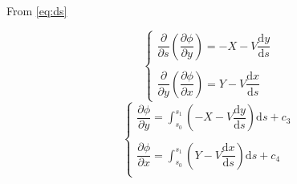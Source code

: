 From \cref{eq:ds}

\begin{equation*}
\left\{\begin{matrix}
    \dfrac{\partial}{\partial s}\left( \dfrac{\partial \phi}{\partial y} \right) = -X - V \dfrac{\mathrm{d}y}{\mathrm{d}s}\\
    \\
    \dfrac{\partial}{\partial y}\left( \dfrac{\partial \phi}{\partial x} \right) = Y - V \dfrac{\mathrm{d}x}{\mathrm{d}s}  
\end{matrix}\right.
\end{equation*}
\begin{equation*}
\left\{\begin{matrix}
    \dfrac{\partial \phi}{\partial y} = \displaystyle\int_{s_0}^{s_1}{\left (-X - V \dfrac{\mathrm{d}y}{\mathrm{d}s}\right)} \mathrm{d}s + c_3\\
    \\
    \dfrac{\partial \phi}{\partial x} = \displaystyle\int_{s_0}^{s_1}{\left(Y - V \dfrac{\mathrm{d}x}{\mathrm{d}s}\right)}\mathrm{d}s + c_4\\ 
\end{matrix}\right.
\end{equation*}